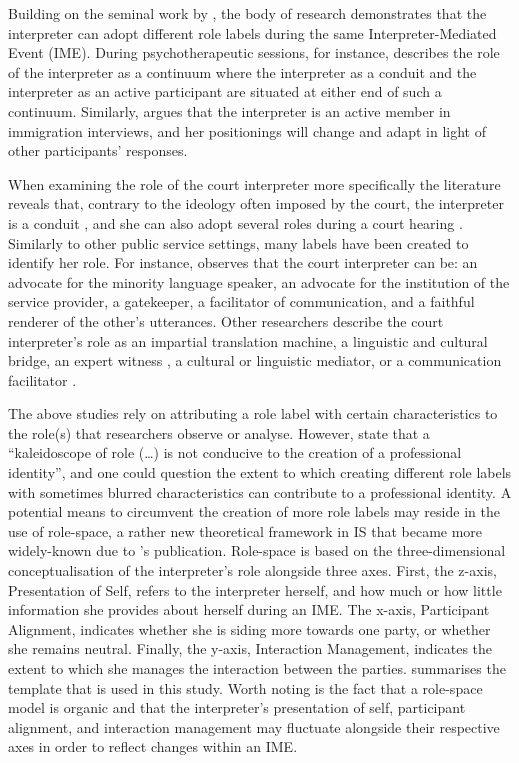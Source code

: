 \documentclass[output=paper]{langsci/langscibook}
\begin{document}
Building on the seminal work by \citet{Wadensjö1998}, the body of research demonstrates that the interpreter can adopt different role labels during the same Interpreter-Mediated Event (\textsc{IME}). During psychotherapeutic sessions, \citet{Bot2009} for instance, describes the role of the interpreter as a continuum where the interpreter as a conduit and the interpreter as an active participant are situated at either end of such a continuum. Similarly, \citet{Mason2009} argues that the interpreter is an active member in immigration interviews, and her positionings will change and adapt in light of other participants’ responses. 

When examining the role of the court interpreter more specifically the literature reveals that, contrary to the ideology often imposed by the court, the interpreter is a conduit \citep{Laster1994}, and she can also adopt several roles during a court hearing \citep{Berk-Seligson1990,Martin2009}. Similarly to other public service settings, many labels have been created to identify her role. For instance, \citet{Hale2008} observes that the court interpreter can be: an advocate for the minority language speaker, an advocate for the institution of the service provider, a gatekeeper, a facilitator of communication, and a faithful renderer of the other’s utterances. Other researchers describe the court interpreter’s role as an impartial translation machine, a linguistic and cultural bridge, an expert witness \citep{Mikkelson1998}, a cultural or linguistic mediator, or a communication facilitator \citep{Nartowska2016}.

The above studies rely on attributing a role label with certain characteristics to the role(s) that researchers observe or analyse. However, \citet[32]{Gentile1996} state that a “kaleidoscope of role (…) is not conducive to the creation of a professional identity”, and one could question the extent to which creating different role labels with sometimes blurred characteristics can contribute to a professional identity. A potential means to circumvent the creation of more role labels may reside in the use of role-space, a rather new theoretical framework in IS that became more widely-known due to \citet{Llewellyn-Jones2014}’s publication. Role-space is based on the three-dimensional conceptualisation of the interpreter’s role alongside three axes. First, the z-axis, Presentation of Self, refers to the interpreter herself, and how much or how little information she provides about herself during an \textsc{IME}. The x-axis, Participant Alignment, indicates whether she is siding more towards one party, or whether she remains neutral. Finally, the y-axis, Interaction Management, indicates the extent to which she manages the interaction between the parties.  summarises the template that is used in this study. Worth noting is the fact that a role-space model is organic and that the interpreter’s presentation of self, participant alignment, and interaction management may fluctuate alongside their respective axes in order to reflect changes within an \textsc{IME}.
\end{document}

